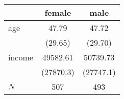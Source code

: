{
\def\sym#1{\ifmmode^{#1}\else\(^{#1}\)\fi}
\begin{tabular}{l*{2}{c}}
\hline\hline
            &\multicolumn{1}{c}{female}&\multicolumn{1}{c}{male}\\
\hline
age         &       47.79         &       47.72         \\
            &     (29.65)         &     (29.70)         \\
[1em]
income      &    49582.61         &    50739.73         \\
            &   (27870.3)         &   (27747.1)         \\
\hline
\(N\)       &         507         &         493         \\
\hline\hline
\end{tabular}
}
